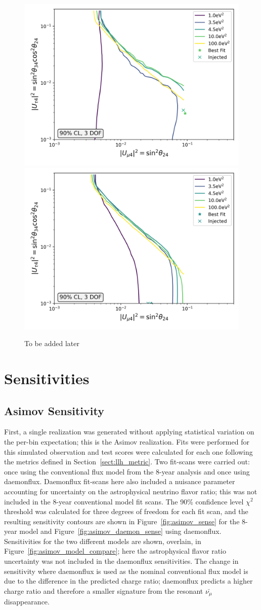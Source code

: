 \documentclass[main.tex]{subfiles}
\begin{document}
\begin{figure}
    \centering
    \includegraphics[width=0.45\linewidth]{figures/inject_recover_RealIR_8_sterile_7_cl0.9_dof3.png}%
    \includegraphics[width=0.45\linewidth]{figures/inject_recover_RealIR_9_sterile_4_cl0.9_dof3.png}
    \caption{To be added later}
\end{figure}



\section{Sensitivities}

\subsection{Asimov Sensitivity}

First, a single realization was generated without applying statistical variation on the per-bin expectation; this is the Asimov realization. 
Fits were performed for this simulated observation and test scores were calculated for each one following the metrics defined in Section~\ref{sect:llh_metric}.
Two fit-scans were carried out: once using the conventional flux model from the 8-year analysis and once using daemonflux. 
Daemonflux fit-scans here also included a nuisance parameter accounting for uncertainty on the astrophysical neutrino flavor ratio; this was not included in the 8-year conventional model fit scans. 
The 90\% confidence level $\chi^{2}$ threshold was calculated for three degrees of freedom for each fit scan, and the resulting sensitivity contours are shown in Figure~\ref{fig:asimov_sense} for the 8-year model and Figure~\ref{fig:asimov_daemon_sense} using daemonflux. 
Sensitivities for the two different models are shown, overlain, in Figure~\ref{fig:asimov_model_compare}; here the astrophysical flavor ratio uncertainty was not included in the daemonflux sensitivities. 
The change in sensitivity where daemonflux is used as the nominal conventional flux model is due to the difference in the predicted charge ratio; daemonflux predicts a higher charge ratio and therefore a smaller signature from the resonant $\bar{\nu_{\mu}}$ disappearance. 
\end{document}
